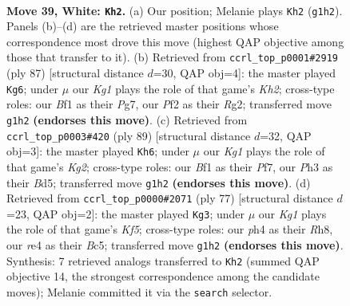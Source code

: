 \documentclass[11pt]{article}
\begin{document}
\clearpage

\begin{figure}[p]\centering
\begin{subfigure}{0.46\textwidth}\centering
\resizebox{\linewidth}{!}{%
\newchessgame
\chessboard[
  setfen={1R6/8/7k/2B1p3/4r2p/5p1P/b4P2/5BK1 w - - 6 39},
  showmover=false,
  pgfstyle=straightmove, color=movearrow, markmove={g1-h2}
]}
\caption{}
\end{subfigure}\hfill
\begin{subfigure}{0.46\textwidth}\centering
\resizebox{\linewidth}{!}{%
\newchessgame
\chessboard[
  setfen={8/6pk/5p2/7R/2B1Pb1P/5P2/6r1/4K3 b - - 0 44},
  showmover=false,
  pgfstyle=straightmove, color=movearrow, markmove={h7-g6}
]}
\caption{}
\end{subfigure}
\\[4pt]
\begin{subfigure}{0.46\textwidth}\centering
\resizebox{\linewidth}{!}{%
\newchessgame
\chessboard[
  setfen={8/5pk1/3b1p2/3b1P2/p2P4/P1K4P/8/4R3 b - - 3 45},
  showmover=false,
  pgfstyle=straightmove, color=movearrow, markmove={g7-h6}
]}
\caption{}
\end{subfigure}\hfill
\begin{subfigure}{0.46\textwidth}\centering
\resizebox{\linewidth}{!}{%
\newchessgame
\chessboard[
  setfen={7r/8/3p4/K1bB1p1p/5k2/2P4P/1P2R3/8 b - - 0 39},
  showmover=false,
  pgfstyle=straightmove, color=movearrow, markmove={f4-g3}
]}
\caption{}
\end{subfigure}
\caption{\textbf{Move 39, White: \texttt{Kh2}.} (a) Our position; Melanie plays \texttt{Kh2} (\texttt{g1h2}). Panels (b)--(d) are the retrieved master positions whose correspondence most drove this move (highest QAP objective among those that transfer to it). (b) Retrieved from \texttt{ccrl\_top\_p0001\#2919} (ply 87) [structural distance $d$=30, QAP obj=4]: the master played \texttt{Kg6}; under $\mu$ our \emph{Kg1} plays the role of that game's \emph{Kh2}; cross-type roles: our \emph{B}f1 as their \emph{P}g7, our \emph{P}f2 as their \emph{R}g2; transferred move \texttt{g1h2} \textbf{(endorses this move)}. (c) Retrieved from \texttt{ccrl\_top\_p0003\#420} (ply 89) [structural distance $d$=32, QAP obj=3]: the master played \texttt{Kh6}; under $\mu$ our \emph{Kg1} plays the role of that game's \emph{Kg2}; cross-type roles: our \emph{B}f1 as their \emph{P}f7, our \emph{P}h3 as their \emph{B}d5; transferred move \texttt{g1h2} \textbf{(endorses this move)}. (d) Retrieved from \texttt{ccrl\_top\_p0000\#2071} (ply 77) [structural distance $d$=23, QAP obj=2]: the master played \texttt{Kg3}; under $\mu$ our \emph{Kg1} plays the role of that game's \emph{Kf5}; cross-type roles: our \emph{p}h4 as their \emph{R}h8, our \emph{r}e4 as their \emph{B}c5; transferred move \texttt{g1h2} \textbf{(endorses this move)}. Synthesis: 7 retrieved analogs transferred to \texttt{Kh2} (summed QAP objective 14, the strongest correspondence among the candidate moves); Melanie committed it via the \texttt{search} selector.}
\label{fig:thought-m76}
\end{figure}
\end{document}
